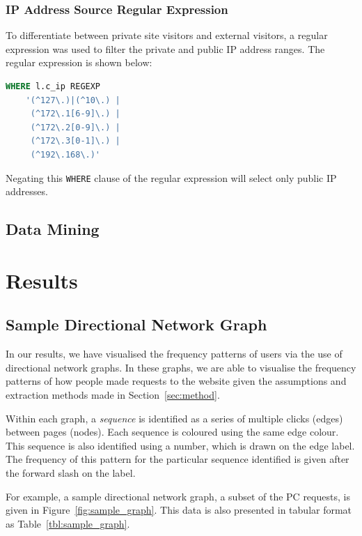 \documentclass[12pt,titlepage]{article}
\begin{document}
\subsubsection{IP Address Source Regular Expression}

To differentiate between private site visitors and external visitors, a regular expression was used to filter the private and public IP address ranges. The regular expression is shown below:

\begin{lstlisting}[language=SQL, xleftmargin=2cm]
WHERE l.c_ip REGEXP 
	'(^127\.)|(^10\.) | 
	 (^172\.1[6-9]\.) |
	 (^172\.2[0-9]\.) |
	 (^172\.3[0-1]\.) |
	 (^192\.168\.)'
\end{lstlisting}

Negating this \texttt{WHERE} clause of the regular expression will select only public IP addresses.

\subsection{Data Mining}

\section{Results}
\label{sec:results}

\subsection{Sample Directional Network Graph}

In our results, we have visualised the frequency patterns of users via the use of directional network graphs. In these graphs, we are able to visualise the frequency patterns of how people made requests to the website given the assumptions and extraction methods made in Section~\ref{sec:method}.

Within each graph, a \textit{sequence} is identified as a series of multiple clicks (edges) between pages (nodes). Each sequence is coloured using the same edge colour. This sequence is also identified using a number, which is drawn on the edge label. The frequency of this pattern for the particular sequence identified is given after the forward slash on the label.

For example, a sample directional network graph, a subset of the PC requests, is given in Figure~\ref{fig:sample_graph}. This data is also presented in tabular format as Table~\ref{tbl:sample_graph}.
\end{document}
